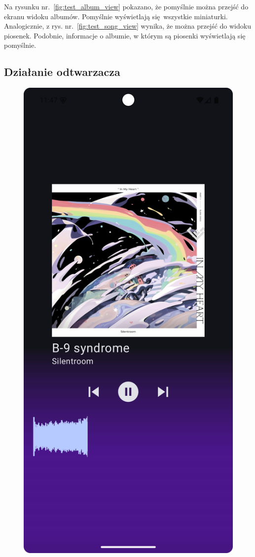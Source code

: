 Na rysunku nr.~\ref{fig:test_album_view} pokazano, że pomyślnie można przejść do ekranu widoku albumów. Pomyślnie wyświetlają się wszystkie miniaturki. Analogicznie, z rys. nr.~\ref{fig:test_song_view} wynika, że można przejść do widoku piosenek. Podobnie, informacje o albumie, w którym są piosenki wyświetlają się pomyślnie. 

\subsection{Działanie odtwarzacza}

\begin{figure}[H]
	\centering
	\includegraphics[width=1\textwidth]{images/test_player_playing.png}

\end{figure}
